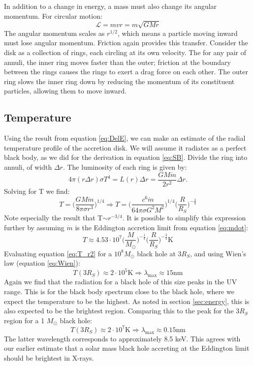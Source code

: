 \documentclass[11pt]{article}
\begin{document}
In addition to a change in energy, a mass must also change its angular momentum. For circular motion:
\begin{equation}
	\mathcal{L} = mvr = m\sqrt{GMr}
\end{equation}
The angular momentum scales as $r^{1/2}$, which means a particle moving inward must lose angular momentum. Friction again provides this transfer. Consider the disk as a collection of rings, each circling at its own velocity. The for any pair of annuli, the inner ring moves faster than the outer; friction at the boundary between the rings causes the rings to exert a drag force on each other. The outer ring slows the inner ring down by reducing the momentum of its constituent particles, allowing them to move inward.\\

\subsection{Temperature}
\noindent
Using the result from equation \ref{eq:DelE}, we can make an estimate of the radial temperature profile of the accretion disk. We will assume it radiates as a perfect black body, as we did for the derivation in equation \ref{eq:SB}. Divide the ring into annuli, of width $\Delta r$. The luminosity of each ring is given by:
\begin{equation}
 4 \pi (r \Delta r)\sigma T^{4}  = L(r) \Delta r = \frac{GM\dot{m} }{2r^2} \Delta r.
\end{equation}
Solving for T we find:
\begin{equation}
	T =  \Big(\frac{GM\dot{m}}{8 \pi \sigma r^{3}} \Big)^{1/4} \Rightarrow T = \Big(\frac{c^6\dot{m}}{64 \pi \sigma G^2 M^2} \Big)^{1/4} \Big(\frac{R}{R_S}\Big)^{-\frac{3}{4}}
	\label{eq:T_r1}
\end{equation}
Note especially the result that T$\sim r^{-3/4}$. It is possible to simplify this expression further by assuming $\dot{m}$ is the Eddington accretion limit from equation \ref{eq:mdot}:
\begin{equation}
	T \approx 4.53\cdot 10^7 \Big(\frac{M}{M_{\odot}}\Big)^{-\frac{1}{4}}\Big(\frac{R}{R_S}\Big)^{-\frac{3}{4}} \mathrm{K}
	\label{eq:T_r2}
\end{equation}
\noindent
Evaluating equation \ref{eq:T_r2} for a $10^8 M_{\odot}$ black hole at 3$R_S$, and using Wien's law (equation \ref{eq:Wien}):
$$T(3R_S) \approx 2\cdot 10^5 \mathrm{K} \Rightarrow \lambda_{\mathrm{max}} \approx 15 \mathrm{nm}$$
Again we find that the radiation for a black hole of this size peaks in the UV range. This is for the black body spectrum close to the black hole, where we expect the temperature to be the highest. As noted in section \ref{sec:energy}, this is also expected to be the brightest region. Comparing this to the peak for the 3$R_S$ region for a 1 $M_{\odot}$ black hole:
$$T(3R_S) \approx 2\cdot 10^7 \mathrm{K} \Rightarrow \lambda_{\mathrm{max}} \approx 0.15 \mathrm{nm}$$
The latter wavelength corresponds to approximately 8.5 keV. This agrees with our earlier estimate that a solar mass black hole accreting at the Eddington limit should be brightest in X-rays.\\
\end{document}
